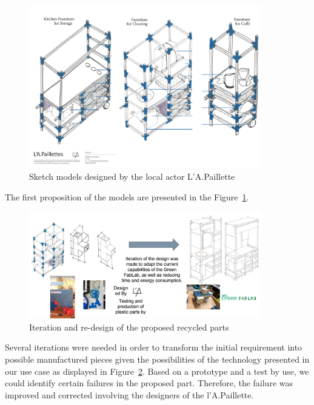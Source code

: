 \documentclass[
  11pt,
]{article}
\begin{document}
\begin{figure}[H]

{\centering \includegraphics[width=0.9\textwidth,height=\textheight]{figures/demos/apa/Modeles-Furniture-00.jpg}

}

\caption{\label{fig-apa-00}Sketch models designed by the local actor
L'A.Paillette}

\end{figure}

The first proposition of the models are presented in the
Figure~\ref{fig-apa-00}.

\begin{figure}[H]

{\centering \includegraphics[width=0.9\textwidth,height=\textheight]{figures/demos/apa/iteration.jpg}

}

\caption{\label{fig-iteration}Iteration and re-design of the proposed
recycled parts}

\end{figure}

Several iterations were needed in order to transform the initial
requirement into possible manufactured pieces given the possibilities of
the technology presented in our use case as displayed in
Figure~\ref{fig-iteration}. Based on a prototype and a test by use, we
could identify certain failures in the proposed part. Therefore, the
failure was improved and corrected involving the designers of the
l'A.Paillette.
\end{document}
